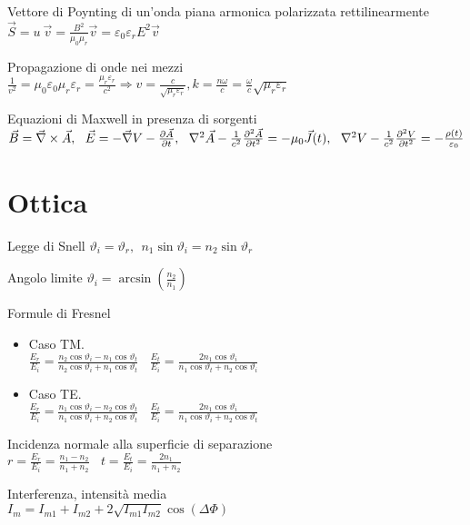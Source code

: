 \documentclass[8pt,a4paper]{article}
\numberwithin{equation}{subsection}
\begin{document}
\begin{multicols}{2}
Vettore di Poynting di un'onda piana armonica polarizzata rettilinearmente $\vec{S} =u\ \vec{v} =\frac{B^{2}}{\mu _{0} \mu _{r}}\vec{v} =\varepsilon _{0} \varepsilon _{r} E^{2}\vec{v}$

Propagazione di onde nei mezzi $\frac{1}{v^{2}} =\mu _{0} \varepsilon _{0} \mu _{r} \varepsilon _{r} =\frac{\mu _{r} \varepsilon _{r}}{c^{2}} \Rightarrow v=\frac{c}{\sqrt{\mu _{r} \varepsilon _{r}}} ,k=\frac{n\omega }{c} =\frac{\omega }{c}\sqrt{\mu _{r} \varepsilon _{r}}$

Equazioni di Maxwell in presenza di sorgenti \\$\vec{B} =\vec{\nabla } \times \vec{A} ,\ \ \vec{E} =-\vec{\nabla } V-\frac{\partial \vec{A}}{\partial t} ,\\\ \ \nabla ^{2}\vec{A} -\frac{1}{c^{2}}\frac{\partial ^{2}\vec{A}}{\partial t^{2}} =-\mu _{0}\vec{J} (t),\ \ \nabla ^{2} V-\frac{1}{c^{2}}\frac{\partial ^{2} V}{\partial t^{2}} =-\frac{\rho (t)}{\varepsilon _{0}}$
\section*{Ottica}

Legge di Snell $\vartheta _{i} =\vartheta _{r} ,\ \ n_{1}\sin \vartheta _{i} =n_{2}\sin \vartheta _{r}$

Angolo limite $\vartheta _{i} =\arcsin\left(\frac{n_{2}}{n_{1}}\right)$

Formule di Fresnel
\begin{itemize}
\item Caso TM. \\$\frac{E_{r}}{E_{i}} =\frac{n_{2}\cos \vartheta _{i} -n_{1}\cos \vartheta _{t}}{n_{2}\cos \vartheta _{i} +n_{1}\cos \vartheta _{t}} \ \ \ \ \frac{E_{t}}{E_{i}} =\frac{2n_{1}\cos \vartheta _{i}}{n_{1}\cos \vartheta _{t} +n_{2}\cos \vartheta _{i}}$
\item Caso TE. \\$\frac{E_{r}}{E_{i}} =\frac{n_{1}\cos \vartheta _{i} -n_{2}\cos \vartheta _{t}}{n_{1}\cos \vartheta _{i} +n_{2}\cos \vartheta _{t}} \ \ \ \ \frac{E_{t}}{E_{i}} =\frac{2n_{1}\cos \vartheta _{i}}{n_{1}\cos \vartheta _{i} +n_{2}\cos \vartheta _{t}}$
\end{itemize}

Incidenza normale alla superficie di separazione \\$r=\frac{E_{r}}{E_{i}} =\frac{n_{1} -n_{2}}{n_{1} +n_{2}} \ \ \ \ t=\frac{E_{t}}{E_{i}} =\frac{2n_{1}}{n_{1} +n_{2}}$

Interferenza, intensità media \\$I_{m} =I_{m1} +I_{m2} +2\sqrt{I_{m1} I_{m2}}\cos (\Delta \Phi )$


\end{multicols}
\end{document}
